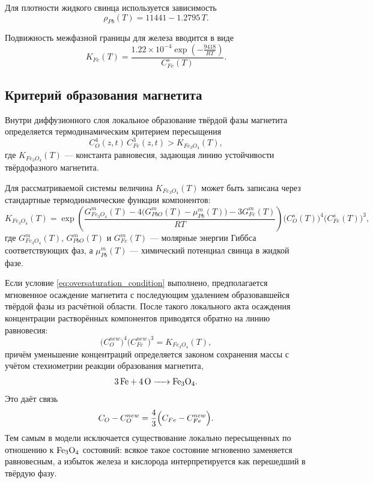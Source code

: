\documentclass[12pt, a4paper]{article}
\begin{document}
Для плотности жидкого свинца используется зависимость
\begin{equation}
\rho_{Pb}(T)=11441-1.2795\,T.
\label{eq:lead_density}
\end{equation}

Подвижность межфазной границы для железа вводится в виде
\begin{equation}
K_{Fe}(T)=\frac{1.22\times 10^{-4}\exp\left(-\frac{9418}{RT}\right)}{C_{Fe}^{s}(T)}.
\label{eq:kfe}
\end{equation}


\subsection*{Критерий образования магнетита}

Внутри диффузионного слоя локальное образование твёрдой фазы магнетита определяется термодинамическим критерием пересыщения
\begin{equation}
C_O^4(z,t)\,C_{Fe}^3(z,t) > K_{Fe_3O_4}(T),
\label{eq:oversaturation_condition}
\end{equation}
где $K_{Fe_3O_4}(T)$ --- константа равновесия, задающая линию устойчивости твёрдофазного магнетита.

Для рассматриваемой системы величина $K_{Fe_3O_4}(T)$ может быть записана через стандартные термодинамические функции компонентов:
\begin{equation}
K_{Fe_3O_4}(T)=
\exp\left(
\frac{
G_{Fe_3O_4}^{m}(T)
-4\bigl(G_{PbO}^{m}(T)-\mu_{Pb}^{m}(T)\bigr)
-3G_{Fe}^{m}(T)
}{RT}
\right)
\bigl(C_O^{s}(T)\bigr)^4
\bigl(C_{Fe}^{s}(T)\bigr)^3,
\label{eq:kfe3o4}
\end{equation}
где $G_{Fe_3O_4}^{m}(T)$, $G_{PbO}^{m}(T)$ и $G_{Fe}^{m}(T)$ --- молярные энергии Гиббса соответствующих фаз, а $\mu_{Pb}^{m}(T)$ --- химический потенциал свинца в жидкой фазе.

Если условие \eqref{eq:oversaturation_condition} выполнено, предполагается мгновенное осаждение магнетита с последующим удалением образовавшейся твёрдой фазы из расчётной области. После такого локального акта осаждения концентрации растворённых компонентов приводятся обратно на линию равновесия:
\begin{equation}
\bigl(C_O^{new}\bigr)^4\bigl(C_{Fe}^{new}\bigr)^3 = K_{Fe_3O_4}(T),
\label{eq:projection_to_equilibrium}
\end{equation}
причём уменьшение концентраций определяется законом сохранения массы с учётом стехиометрии реакции образования магнетита,
\begin{equation}
\ce{3Fe + 4O -> Fe3O4}.
\end{equation}
Это даёт связь
\begin{equation}
C_O-C_O^{new}
=\frac{4}{3}\Bigl(C_{Fe}-C_{Fe}^{new}\Bigr).
\label{eq:mass_conservation}
\end{equation}
Тем самым в модели исключается существование локально пересыщенных по отношению к $\ce{Fe3O4}$ состояний: всякое такое состояние мгновенно заменяется равновесным, а избыток железа и кислорода интерпретируется как перешедший в твёрдую фазу.
\end{document}
